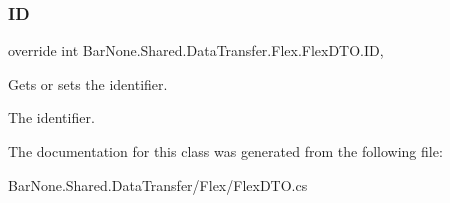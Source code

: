 \subsubsection{\texorpdfstring{ID}{ID}}
{\footnotesize\ttfamily override int Bar\+None.\+Shared.\+Data\+Transfer.\+Flex.\+Flex\+D\+T\+O.\+ID\hspace{0.3cm}{\ttfamily [get]}, {\ttfamily [set]}}



Gets or sets the identifier. 

The identifier. 

The documentation for this class was generated from the following file\+:\begin{DoxyCompactItemize}
\item 
Bar\+None.\+Shared.\+Data\+Transfer/\+Flex/Flex\+D\+T\+O.\+cs\end{DoxyCompactItemize}
